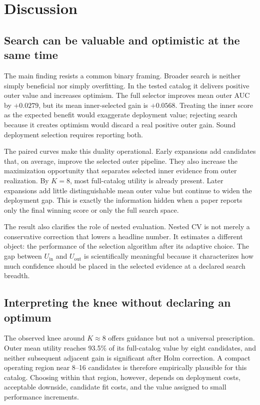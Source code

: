 \documentclass[referee]{USG}
\newcommand{\uinner}{\ensuremath{U_{\mathrm{in}}}}
\newcommand{\uouter}{\ensuremath{U_{\mathrm{out}}}}
\begin{document}
\section{Discussion}
\subsection{Search can be valuable and optimistic at the same time}
The main finding resists a common binary framing. Broader search is neither simply beneficial nor simply overfitting. In the tested catalog it delivers positive outer value and increases optimism. The full selector improves mean outer AUC by $+0.0279$, but its mean inner-selected gain is $+0.0568$. Treating the inner score as the expected benefit would exaggerate deployment value; rejecting search because it creates optimism would discard a real positive outer gain. Sound deployment selection requires reporting both.

The paired curves make this duality operational. Early expansions add candidates that, on average, improve the selected outer pipeline. They also increase the maximization opportunity that separates selected inner evidence from outer realization. By $K=8$, most full-catalog utility is already present. Later expansions add little distinguishable mean outer value but continue to widen the deployment gap. This is exactly the information hidden when a paper reports only the final winning score or only the full search space.

The result also clarifies the role of nested evaluation. Nested CV is not merely a conservative correction that lowers a headline number. It estimates a different object: the performance of the selection algorithm after its adaptive choice. The gap between $\uinner$ and $\uouter$ is scientifically meaningful because it characterizes how much confidence should be placed in the selected evidence at a declared search breadth.

\subsection{Interpreting the knee without declaring an optimum}
The observed knee around $K\approx8$ offers guidance but not a universal prescription. Outer mean utility reaches 93.5\% of its full-catalog value by eight candidates, and neither subsequent adjacent gain is significant after Holm correction. A compact operating region near 8--16 candidates is therefore empirically plausible for this catalog. Choosing within that region, however, depends on deployment costs, acceptable downside, candidate fit costs, and the value assigned to small performance increments.
\end{document}
